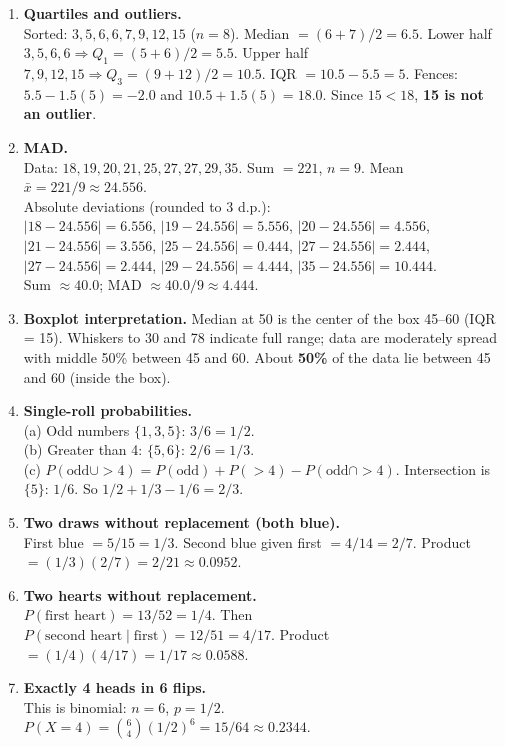 \documentclass[11pt]{article}
\begin{document}
\begin{enumerate}
\item \textbf{Quartiles and outliers.}\\
Sorted: $3,5,6,6,7,9,12,15$ ($n=8$). Median $=(6+7)/2=6.5$. Lower half $3,5,6,6 \Rightarrow Q_1=(5+6)/2=5.5$. Upper half $7,9,12,15 \Rightarrow Q_3=(9+12)/2=10.5$. IQR $=10.5-5.5=5$. Fences: $5.5-1.5(5)= -2.0$ and $10.5+1.5(5)=18.0$. Since $15<18$, \textbf{15 is not an outlier}.

\item \textbf{MAD.}\\
Data: $18,19,20,21,25,27,27,29,35$. Sum $=221$, $n=9$. Mean $\bar{x}=221/9\approx24.556$.\\
Absolute deviations (rounded to 3 d.p.):\\
$|18-24.556|=6.556$, $|19-24.556|=5.556$, $|20-24.556|=4.556$, $|21-24.556|=3.556$, $|25-24.556|=0.444$, $|27-24.556|=2.444$, $|27-24.556|=2.444$, $|29-24.556|=4.444$, $|35-24.556|=10.444$.\\
Sum $\approx 40.0$; MAD $\approx 40.0/9 \approx 4.444$.

\item \textbf{Boxplot interpretation.}
Median at 50 is the center of the box 45--60 (IQR = 15). Whiskers to 30 and 78 indicate full range; data are moderately spread with middle 50\% between 45 and 60. About \textbf{50\%} of the data lie between 45 and 60 (inside the box).

\item \textbf{Single-roll probabilities.}\\
(a) Odd numbers $\{1,3,5\}$: $3/6=1/2$.\\
(b) Greater than 4: $\{5,6\}$: $2/6=1/3$.\\
(c) $P(\text{odd}\cup >4)=P(\text{odd})+P(>4)-P(\text{odd}\cap >4)$. Intersection is $\{5\}$: $1/6$. So $1/2+1/3-1/6=2/3$.

\item \textbf{Two draws without replacement (both blue).}\\
First blue $=5/15=1/3$. Second blue given first $=4/14=2/7$. Product $=(1/3)(2/7)=2/21\approx0.0952$.

\item \textbf{Two hearts without replacement.}\\
$P(\text{first heart})=13/52=1/4$. Then $P(\text{second heart}\mid \text{first})=12/51=4/17$. Product $=(1/4)(4/17)=1/17\approx0.0588$.

\item \textbf{Exactly 4 heads in 6 flips.}\\
This is binomial: $n=6$, $p=1/2$. $P(X=4)=\binom{6}{4}(1/2)^6=15/64\approx0.2344$.


\end{enumerate}
\end{document}
